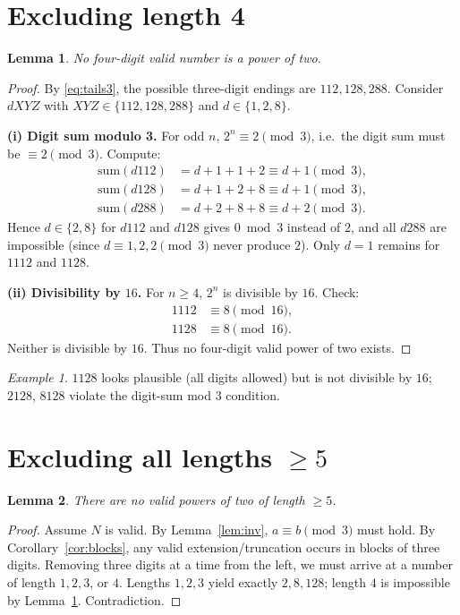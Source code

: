 \documentclass[12pt]{article}
\theoremstyle{plain}
\newtheorem{lemma}{Lemma}
\theoremstyle{remark}
\newtheorem*{example}{Example}
\begin{document}
\section{Excluding length 4}
\begin{lemma}\label{lem:len4}
No four-digit valid number is a power of two.
\end{lemma}

\begin{proof}
By \eqref{eq:tails3}, the possible three-digit endings are $112,128,288$. Consider $dXYZ$ with $XYZ\in\{112,128,288\}$ and $d\in\{1,2,8\}$.

\smallskip
\noindent\textbf{(i) Digit sum modulo 3.} For odd $n$, $2^n\equiv2\pmod3$, i.e.\ the digit sum must be $\equiv2\pmod3$. Compute:
\begin{align*}
\mathrm{sum}(d112)&=d+1+1+2\equiv d+1\pmod3,\\
\mathrm{sum}(d128)&=d+1+2+8\equiv d+1\pmod3,\\
\mathrm{sum}(d288)&=d+2+8+8\equiv d+2\pmod3.
\end{align*}
Hence $d\in\{2,8\}$ for $d112$ and $d128$ gives $0\bmod3$ instead of $2$, and all $d288$ are impossible (since $d\equiv1,2,2\pmod3$ never produce $2$). Only $d=1$ remains for $1112$ and $1128$.

\smallskip
\noindent\textbf{(ii) Divisibility by $16$.} For $n\ge4$, $2^n$ is divisible by $16$. Check:
\begin{align*}
1112 &\equiv 8 \pmod{16},\\
1128 &\equiv 8 \pmod{16}.
\end{align*}
Neither is divisible by $16$. Thus no four-digit valid power of two exists.
\end{proof}

\begin{example}
$1128$ looks plausible (all digits allowed) but is not divisible by $16$; $2128$, $8128$ violate the digit-sum mod $3$ condition.
\end{example}

\section{Excluding all lengths $\ge5$}
\begin{lemma}\label{lem:len5}
There are no valid powers of two of length $\ge5$.
\end{lemma}

\begin{proof}
Assume $N$ is valid. By Lemma~\ref{lem:inv}, $a\equiv b\pmod3$ must hold. By Corollary~\ref{cor:blocks}, any valid extension/truncation occurs in blocks of three digits. Removing three digits at a time from the left, we must arrive at a number of length $1,2,3$, or $4$. Lengths $1,2,3$ yield exactly $2,8,128$; length $4$ is impossible by Lemma~\ref{lem:len4}. Contradiction.
\end{proof}
\end{document}
